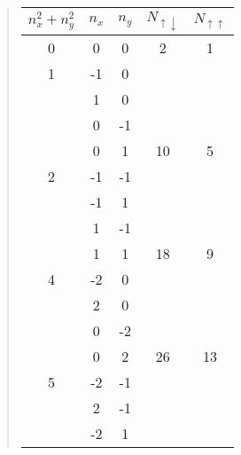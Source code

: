 \documentclass[%
twoside,                 %
final,                   %
10pt]{article}
\begin{document}
\begin{quote}
\begin{tabular}{ccccc}
\hline
\multicolumn{1}{c}{ $n_{x}^{2}+n_{y}^{2}$ } & \multicolumn{1}{c}{ $n_{x}$ } & \multicolumn{1}{c}{ $n_{y}$ } & \multicolumn{1}{c}{ $N_{\uparrow \downarrow }$ } & \multicolumn{1}{c}{ $N_{\uparrow \uparrow }$ } \\
\hline
0                     & 0       & 0       & 2                          & 1                        \\
\hline
1                     & -1      & 0       &                            &                          \\
                      & 1       & 0       &                            &                          \\
                      & 0       & -1      &                            &                          \\
                      & 0       & 1       & 10                         & 5                        \\
\hline
2                     & -1      & -1      &                            &                          \\
                      & -1      & 1       &                            &                          \\
                      & 1       & -1      &                            &                          \\
                      & 1       & 1       & 18                         & 9                        \\
\hline
4                     & -2      & 0       &                            &                          \\
                      & 2       & 0       &                            &                          \\
                      & 0       & -2      &                            &                          \\
                      & 0       & 2       & 26                         & 13                       \\
\hline
5                     & -2      & -1      &                            &                          \\
                      & 2       & -1      &                            &                          \\
                      & -2      & 1       &                            &                          \\

\end{tabular}
\end{quote}
\end{document}

